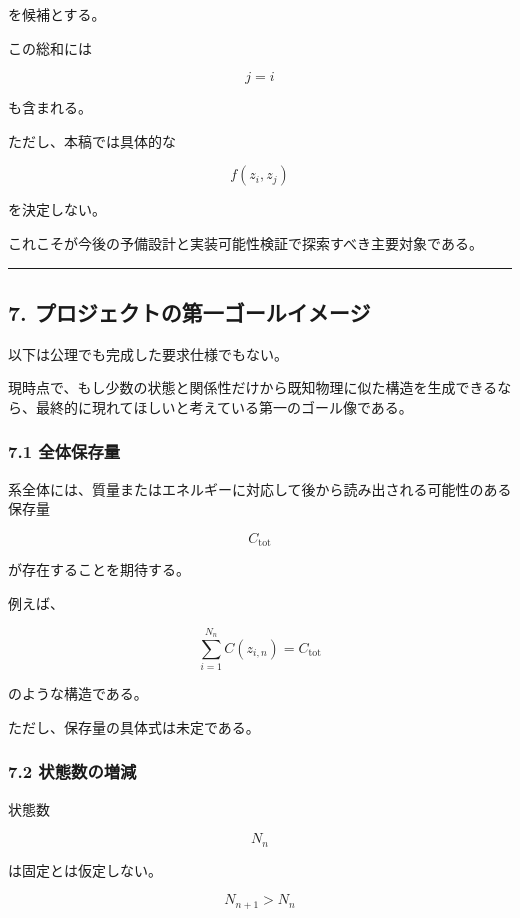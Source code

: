 \documentclass[
  a4paper,
]{ltjsarticle}
\begin{document}
を候補とする。

この総和には

\[
j=i
\]

も含まれる。

ただし、本稿では具体的な

\[
f(z_i,z_j)
\]

を決定しない。

これこそが今後の予備設計と実装可能性検証で探索すべき主要対象である。

\begin{center}\rule{0.5\linewidth}{0.5pt}\end{center}

\subsection{7.
プロジェクトの第一ゴールイメージ}\label{ux30d7ux30edux30b8ux30a7ux30afux30c8ux306eux7b2cux4e00ux30b4ux30fcux30ebux30a4ux30e1ux30fcux30b8}

以下は公理でも完成した要求仕様でもない。

現時点で、もし少数の状態と関係性だけから既知物理に似た構造を生成できるなら、最終的に現れてほしいと考えている第一のゴール像である。

\subsubsection{7.1 全体保存量}\label{ux5168ux4f53ux4fddux5b58ux91cf}

系全体には、質量またはエネルギーに対応して後から読み出される可能性のある保存量

\[
C_{\mathrm{tot}}
\]

が存在することを期待する。

例えば、

\[
\boxed{
\sum_{i=1}^{N_n} C(z_{i,n})=C_{\mathrm{tot}}
}
\]

のような構造である。

ただし、保存量の具体式は未定である。

\subsubsection{7.2
状態数の増減}\label{ux72b6ux614bux6570ux306eux5897ux6e1b}

状態数

\[
N_n
\]

は固定とは仮定しない。

\[
N_{n+1}>N_n
\]
\end{document}

